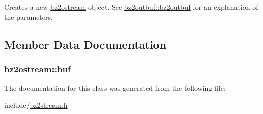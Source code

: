 Creates a new \hyperlink{classbz2ostream}{bz2ostream} object. See \hyperlink{classbz2outbuf_ad907143431be210070e941c963df0f14}{bz2outbuf\+::bz2outbuf} for an explanation of the parameters. 



\subsection{Member Data Documentation}
\hypertarget{classbz2ostream_afc503bb7dba240ec2384872767bdb3ba}{}
\subsubsection[{buf}]{ bz2ostream\+::buf\hspace{0.3cm}{\ttfamily [protected]}}\label{classbz2ostream_afc503bb7dba240ec2384872767bdb3ba}


The documentation for this class was generated from the following file\+:\begin{DoxyCompactItemize}
\item 
include/\hyperlink{bz2stream_8h}{bz2stream.\+h}\end{DoxyCompactItemize}
